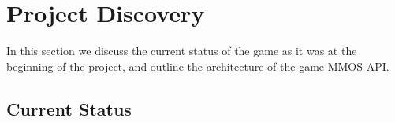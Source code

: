 \section{Project Discovery}\label{sec:project_discovery}
In this section we discuss the current status of the game as it was at the beginning of the project, and outline the architecture of the game  MMOS API.
\subsection{Current Status}


